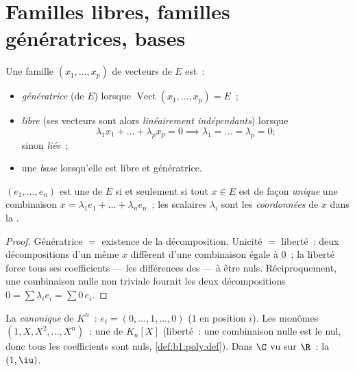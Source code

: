 \section{Familles libres, familles génératrices, bases}

\begin{definition}\label{def:b1:vspaces:free}
Une famille $(x_1, \dots, x_p)$ de vecteurs de $E$ est~:
\begin{itemize}
  \item \emph{génératrice} (de $E$) lorsque
        $\operatorname{Vect}(x_1,\dots,x_p) = E$~;
  \item \emph{libre} (ses vecteurs sont alors
        \emph{linéairement indépendants}) lorsque
        \[
        \lambda_1 x_1 + \dots + \lambda_p x_p = 0
        \implies \lambda_1 = \dots = \lambda_p = 0 ;
        \]
        sinon \emph{liée}~;
  \item une \emph{base} lorsqu'elle est libre et
        génératrice.
\end{itemize}
\end{definition}

\begin{proposition}[Coordonnées]\label{prop:b1:vspaces:coordinates}
$(e_1, \dots, e_n)$ est une  de $E$ si et seulement si tout
$x \in E$ est de façon \emph{unique} une combinaison $x = \lambda_1 e_1
+ \dots + \lambda_n e_n$~; les scalaires $\lambda_i$ sont les
\emph{coordonnées} de $x$ dans la .
\end{proposition}

\begin{proof}
Génératrice $=$ existence de la décomposition. Unicité $=$
liberté~: deux décompositions d'un même $x$ diffèrent d'une
combinaison égale à $0$~; la liberté force tous ses coefficients ---
les différences des  --- à être nuls. Réciproquement, une
combinaison nulle non triviale fournit les deux décompositions
$0 = \sum \lambda_i e_i = \sum 0\,e_i$.
\end{proof}

\begin{example}\label{ex:b1:vspaces:bases}
La \emph{ canonique} de $K^n$~: $e_i = (0, \dots, 1, \dots, 0)$
($1$ en position $i$). Les monômes $(1, X, X^2, \dots, X^n)$~: une
 de $K_n[X]$ (liberté~: une combinaison nulle est le  nul,
donc tous les coefficients sont nuls, \cref{def:b1:poly:def}). Dans
$\C$ vu sur $\R$~: la  $(1, \iu)$.
\end{example}


